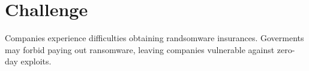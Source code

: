 \vspace{-0.16cm}
\section{Challenge}
\vspace{-0.15cm}
Companies experience difficulties obtaining randsomware insurances. Goverments may forbid paying out ransomware, leaving companies vulnerable against zero-day exploits.